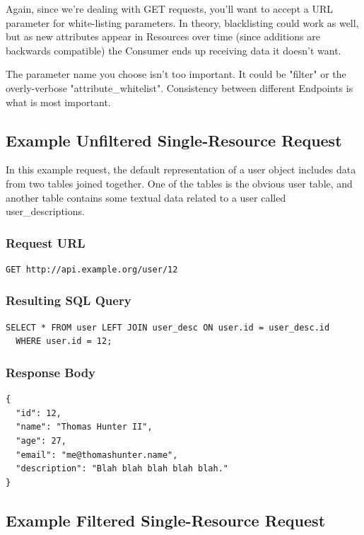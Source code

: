 \documentclass{book}
\begin{document}
Again, since we're dealing with GET requests, you'll want to accept a URL parameter for white-listing parameters. In theory, blacklisting could work as well, but as new attributes appear in Resources over time (since additions are backwards compatible) the Consumer ends up receiving data it doesn't want.

The parameter name you choose isn't too important. It could be "filter" or the overly-verbose "attribute\_whitelist". Consistency between different Endpoints is what is most important.

\subsection{Example Unfiltered Single-Resource Request}

In this example request, the default representation of a user object includes data from two tables joined together. One of the tables is the obvious user table, and another table contains some textual data related to a user called user\_descriptions.

\subsubsection{Request URL}

\begin{verbatim}
GET http://api.example.org/user/12
\end{verbatim}

\subsubsection{Resulting SQL Query}

\begin{verbatim}
SELECT * FROM user LEFT JOIN user_desc ON user.id = user_desc.id
  WHERE user.id = 12;
\end{verbatim}

\subsubsection{Response Body}

\begin{verbatim}
{
  "id": 12,
  "name": "Thomas Hunter II",
  "age": 27,
  "email": "me@thomashunter.name",
  "description": "Blah blah blah blah blah."
}
\end{verbatim}

\subsection{Example Filtered Single-Resource Request}
\end{document}
